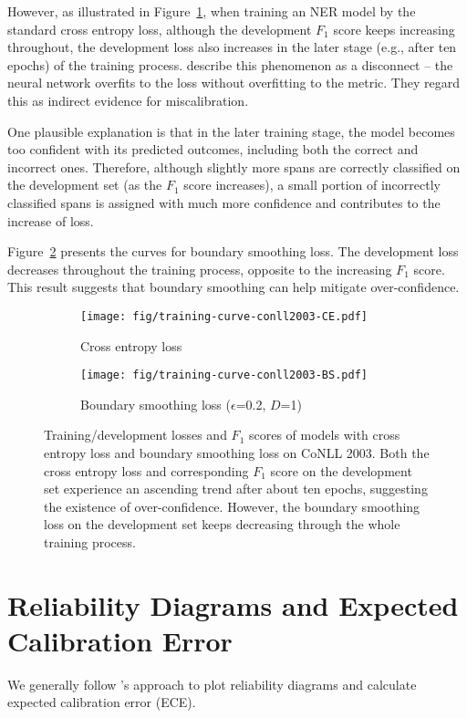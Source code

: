 \documentclass[11pt]{article}
\begin{document}
However, as illustrated in Figure~\ref{subfig:training-curves-ce}, when training an NER model by the standard cross entropy loss, although the development $F_1$ score keeps increasing throughout, the development loss also increases in the later stage (e.g., after ten epochs) of the training process. \citet{guo2017calibration} describe this phenomenon as a disconnect -- the neural network overfits to the loss without overfitting to the metric. They regard this as indirect evidence for miscalibration. 

One plausible explanation is that in the later training stage, the model becomes too confident with its predicted outcomes, including both the correct and incorrect ones. Therefore, although slightly more spans are correctly classified on the development set (as the $F_1$ score increases), a small portion of incorrectly classified spans is assigned with much more confidence and contributes to the increase of loss. 

Figure~\ref{subfig:training-curves-bs} presents the curves for boundary smoothing loss. The development loss decreases throughout the training process, opposite to the increasing $F_1$ score. This result suggests that boundary smoothing can help mitigate over-confidence. 

\begin{figure}[t]
    \centering
    \begin{subfigure}{\columnwidth}
    \centering
    \texttt{[image: fig/training-curve-conll2003-CE.pdf]}
    \caption{Cross entropy loss}
    \label{subfig:training-curves-ce}
    \end{subfigure}
    \begin{subfigure}{\columnwidth}
    \centering
    \texttt{[image: fig/training-curve-conll2003-BS.pdf]}
    \caption{Boundary smoothing loss ($\epsilon$=0.2, $D$=1)}
    \label{subfig:training-curves-bs}
    \end{subfigure}
    \caption{Training/development losses and $F_1$ scores of models with cross entropy loss and boundary smoothing loss on CoNLL 2003. Both the cross entropy loss and corresponding $F_1$ score on the development set experience an ascending trend after about ten epochs, suggesting the existence of over-confidence. However, the boundary smoothing loss on the development set keeps decreasing through the whole training process.}
    \label{fig:training-curves}
\end{figure}


\section{Reliability Diagrams and Expected Calibration Error} \label{sec:calibration}
We generally follow \citet{guo2017calibration}'s approach to plot reliability diagrams and calculate expected calibration error (ECE). 
\end{document}
